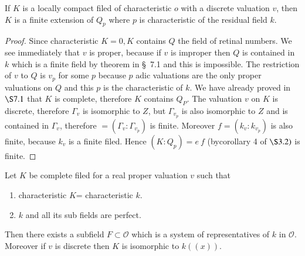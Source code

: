 \begin{proposition}\label{part1:chap2:sec4:prop3}%
  If $K$ is a locally compact filed of characteristic $o$ with a
  discrete valuation $v$, then $K$ is a finite extension of $Q_p$
  where $p$ is characteristic of the residual field $k$. 
\end{proposition}

\begin{proof}
  Since characteristic $K = 0, K$ contains $Q$ the field of retinal
  numbers. We see immediately that $v$ is proper, because if $v$ is
  improper then $Q$ is contained in $k$ which is a finite field by
  theorem in \S\ 7.1 and this is impossible. The restriction of $v$ to
  $Q$ is $v_p$ for some $p$ because $p$ adic valuations are the only
  proper valuations on $Q$ and this $p$ is the characteristic of
  $k$. We have already proved in $\S7.1$ that $K$ is complete,
  therefore $K$ contains $Q_P$. The valuation $v$ on $K$ is discrete,
  therefore $\Gamma_v$ is isomorphic to $Z$,  but $\Gamma_{v_p}$ is
  also isomorphic to $Z$ and is contained in $\Gamma _v$, therefore $=
  (\Gamma_v:  \Gamma_{v_p})$ is finite. Moreover $f= (k_v:  k_{v_p})$ is
  also finite, because $k_v$ is a finite filed. Hence $(K:  Q_p)=e ~f$
  (by\pageoriginale corollary 4 of $\S 3.2)$ is finite. 
\end{proof}

\begin{proposition}\label{part1:chap2:sec4:prop4}%
  Let $K$ be complete filed for a real proper valuation $v$ such that
  \begin{enumerate}[\rm(1)]
  \item characteristic $K$= characteristic $k$.
  \item $k$ and all its sub fields are perfect.
  \end{enumerate}
  Then there exists a subfield $F \subset \mathscr{O}$ which is a
  system of representatives of $k$ in $\mathscr{O}$. Moreover if $v$
  is discrete then $K$ is isomorphic to $k ((x))$. 
\end{proposition}

